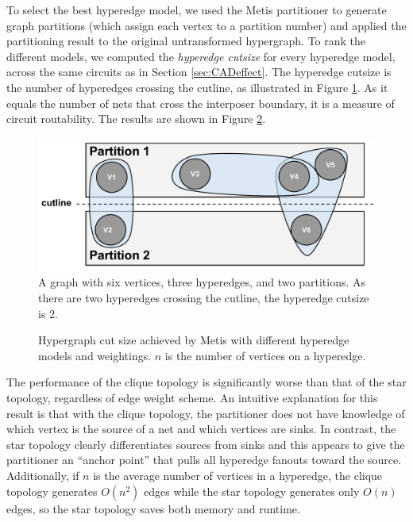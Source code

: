 To select the best hyperedge model, we used the Metis partitioner to generate graph partitions (which assign each vertex to a partition number) and applied the partitioning result to the original untransformed hypergraph. To rank the different models, we computed the \emph{hyperedge cutsize} for every hyperedge model, across the same circuits as in Section \ref{sec:CADeffect}. The hyperedge cutsize is the number of hyperedges crossing the cutline, as illustrated in Figure \ref{fig:hyperedge_cutline}. As it equals the number of nets that cross the interposer boundary, it is a measure of circuit routability. The results are shown in Figure \ref{fig:graph_topology_cutsize}.

\begin{figure}[!htbp]
\centering
\includegraphics[width=\linewidth]{hyperedge_cutline.pdf}
\caption{A graph with six vertices, three hyperedges, and two partitions. As there are two hyperedges crossing the cutline, the hyperedge cutsize is 2.}
\label{fig:hyperedge_cutline}
\end{figure}

\begin{figure}[!htbp]
\centering
%

\caption{Hypergraph cut size achieved by Metis with different hyperedge models and weightings. $n$ is the number of vertices on a hyperedge.}
\label{fig:graph_topology_cutsize}
\end{figure}

The performance of the clique topology is significantly worse than that of the star topology, regardless of edge weight scheme. An intuitive explanation for this result is that with the clique topology, the partitioner does not have knowledge of which vertex is the source of a net and which vertices are sinks. In contrast, the star topology clearly differentiates sources from sinks and this appears to give the partitioner an “anchor point” that pulls all hyperedge fanouts toward the source. Additionally, if $n$ is the average number of vertices in a hyperedge, the clique topology generates $O(n^2)$ edges while the star topology generates only $O(n)$ edges, so the star topology saves both memory and runtime.

